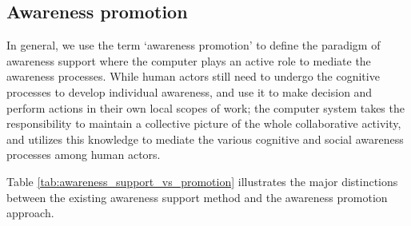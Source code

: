 \subsection{Awareness promotion} %
\label{sub:awareness_promotion}
In general, we use the term `awareness promotion' to define the paradigm of awareness support where the computer plays an active role to mediate the awareness processes. While human actors still need to undergo the cognitive processes to develop individual awareness, and use it to make decision and perform actions in their own local scopes of work; the computer system takes the responsibility to maintain a collective picture of the whole collaborative activity, and utilizes this knowledge to mediate the various cognitive and social awareness processes among human actors.

Table \ref{tab:awareness_support_vs_promotion} illustrates the major distinctions between the existing awareness support method and the awareness promotion approach.

